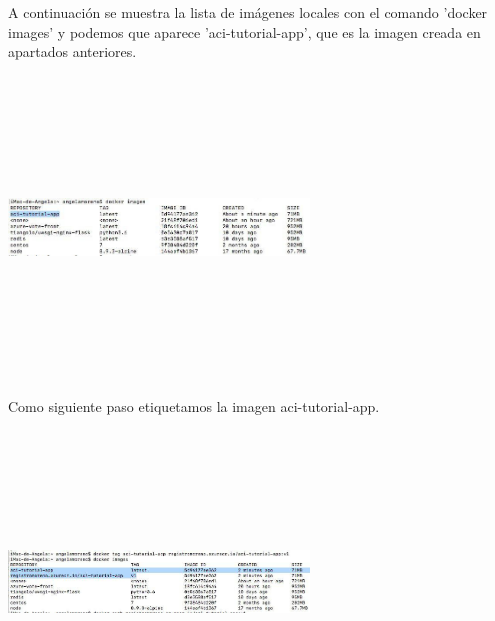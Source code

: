 \documentclass[english,runningheads,a4paper]{llncs}[2018/03/10]
\newenvironment{nscenter}
 {\parskip=0pt\par\nopagebreak\centering}
 {\par\noindent\ignorespacesafterend}
\begin{document}
\newline
A continuación se muestra la lista de imágenes locales con el comando 'docker 
images' y podemos que aparece 'aci-tutorial-app', que es la imagen creada en 
apartados anteriores.
\newline
\begin{nscenter}
\includegraphics[width=8cm,height=8cm,keepaspectratio]{./Contenedores/Azure/18.jpg}
\end{nscenter}
\newline
Como siguiente paso etiquetamos la imagen aci-tutorial-app.
\newline
\begin{nscenter}
\includegraphics[width=8cm,height=8cm,keepaspectratio]{./Contenedores/Azure/19.jpg}
\end{nscenter}
\end{document}
